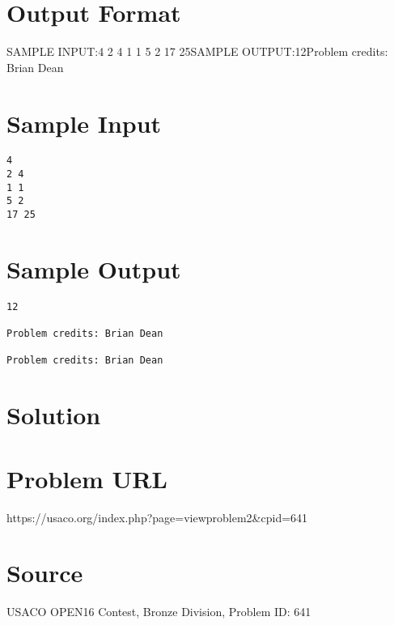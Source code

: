 \documentclass[12pt]{article}
\begin{document}
\section*{Output Format}
SAMPLE INPUT:4
2 4
1 1
5 2
17 25SAMPLE OUTPUT:12Problem credits: Brian Dean

\section*{Sample Input}
\begin{verbatim}
4
2 4
1 1
5 2
17 25
\end{verbatim}

\section*{Sample Output}
\begin{verbatim}
12

Problem credits: Brian Dean

Problem credits: Brian Dean
\end{verbatim}

\section*{Solution}


\section*{Problem URL}
https://usaco.org/index.php?page=viewproblem2&cpid=641

\section*{Source}
USACO OPEN16 Contest, Bronze Division, Problem ID: 641
\end{document}
